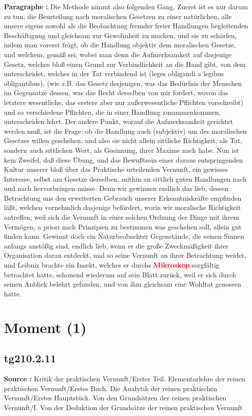 \documentclass[a4paper,12pt,twoside]{book}
\newcommand{\match}[1]{\textcolor{red}{\textbf{#1}}}
\newcommand{\unnumberedsection}[1]{
	\section*{#1}
	\addcontentsline{toc}{section}{#1}
	\markright{#1}
}
\begin{document}
	\textbf{Paragraphe : }Die Methode nimmt also folgenden Gang. Zuerst ist es nur darum zu tun, die Beurteilung nach moralischen Gesetzen zu einer natürlichen, alle unsere eigene sowohl als die Beobachtung fremder freier Handlungen begleitenden Beschäftigung und gleichsam zur Gewohnheit zu machen, und sie zu schärfen, indem man vorerst frägt, ob die Handlung objektiv dem moralischen Gesetze, und welchem, gemäß sei; wobei man denn die Aufmerksamkeit auf dasjenige Gesetz, welches bloß einen Grund zur Verbindlichkeit an die Hand gibt, von dem unterscheidet, welches in der Tat verbindend ist (leges obligandi a legibus obligantibus), (wie z.B. das Gesetz desjenigen, was das Bedürfnis der Menschen im Gegensatze dessen, was das Recht derselben von mir fordert, wovon das letztere wesentliche, das erstere aber nur außerwesentliche Pflichten vorschreibt) und so verschiedene Pflichten, die in einer Handlung zusammenkommen, unterscheiden lehrt. Der andere Punkt, worauf die Aufmerksamkeit gerichtet werden muß, ist die Frage: ob die Handlung auch (subjektiv) um des moralischen Gesetzes willen geschehen, und also sie nicht allein sittliche Richtigkeit, als Tat, sondern auch sittlichen Wert, als Gesinnung, ihrer Maxime nach habe. Nun ist kein Zweifel, daß diese Übung, und das Bewußtsein einer daraus entspringenden Kultur unserer bloß über das Praktische urteilenden Vernunft, ein gewisses Interesse, selbst am Gesetze derselben, mithin an sittlich guten Handlungen nach und nach hervorbringen müsse. Denn wir gewinnen endlich das lieb, dessen Betrachtung uns den erweiterten Gebrauch unserer Erkenntniskräfte empfinden läßt, welchen vornehmlich dasjenige befördert, worin wir moralische Richtigkeit antreffen; weil sich die Vernunft in einer solchen Ordnung der Dinge mit ihrem Vermögen, a priori nach Prinzipien zu bestimmen was geschehen soll, allein gut finden kann. Gewinnt doch ein Naturbeobachter Gegenstände, die seinen Sinnen anfangs anstößig sind, endlich lieb, wenn er die große Zweckmäßigkeit ihrer Organisation daran entdeckt,  und so seine Vernunft an ihrer Betrachtung weidet, und Leibniz brachte ein Insekt, welches er durchs \match{Mikroskop} sorgfältig betrachtet hatte, schonend wiederum auf sein Blatt zurück, weil er sich durch seinen Anblick belehrt gefunden, und von ihm gleichsam eine Wohltat genossen hatte. 
	
	\unnumberedsection{Moment (1)} 
	\subsection*{tg210.2.11} 
	\textbf{Source : }Kritik der praktischen Vernunft/Erster Teil. Elementarlehre der reinen praktischen Vernunft/Erstes Buch. Die Analytik der reinen praktischen Vernunft/Erstes Hauptstück. Von den Grundsätzen der reinen praktischen Vernunft/I. Von der Deduktion der Grundsätze der reinen praktischen Vernunft\\  
	
\end{document}
